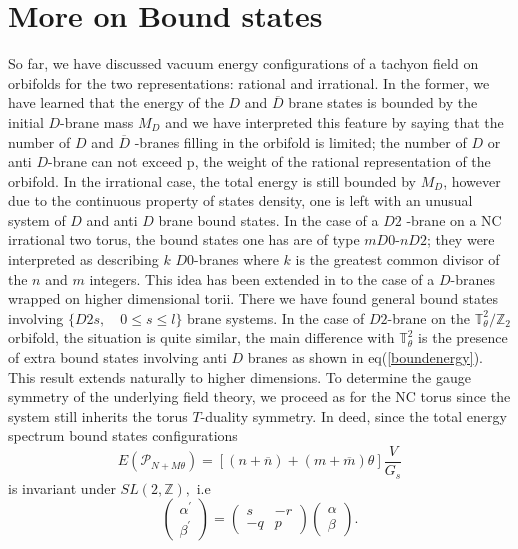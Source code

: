 \documentclass[a4paper,12pt]{article}
\begin{document}
\section{More on Bound states}

So far, we have discussed vacuum energy configurations of a
tachyon field on orbifolds for the two representations: rational
and irrational. In the former, we have learned that the energy of
the $D$ and $\overline{D}$ brane states is bounded by the initial
$D$-brane mass $M_{D}$ and we have
interpreted this feature by saying that the number of $D$ and $\overline{D}$%
-branes filling in the orbifold is limited; the number of $D$ or
anti $D$-brane can not exceed p, the weight of the rational
representation of the orbifold. In the irrational case, the total
energy is still bounded by $M_{D}$, however due to the continuous
property of states density, one is left with an
unusual system of $D$ and anti $D$ brane bound states. In the case of a $D2$%
-brane on a NC irrational two torus, the bound states one has are
of type $mD0$-$nD2$; they were interpreted as describing $k$
$D0$-branes where $k$ is the greatest common divisor of the $n$
and $m$ integers. This idea has been extended in \cite{j} to the
case of a $D$-branes wrapped on higher dimensional torii. There we
have found general bound states involving $\{D2s,\quad 0\le s\le
l\}$
 brane systems.
 In the case of $D2$-brane on the $\mathbb{T}_{\theta }^{2}/\mathbb{Z}_{2}$
orbifold, the situation is quite similar, the main difference with $\mathbb{T%
}_{\theta }^{2}$ is the presence of extra bound states involving
anti $D$ branes as shown in eq(\ref{boundenergy}). This result
extends naturally to higher dimensions. To determine the gauge
symmetry of the underlying field
theory, we proceed as for the NC torus since the system still inherits the torus $%
T $-duality symmetry. In deed, since the total energy spectrum bound states
configurations
\begin{equation}
E\left( \mathcal{P}_{N+M\theta }\right) =\left[ (n+\overline{n})+(m+%
\overline{m})\theta \right] \frac{V}{G_{s}}
\end{equation}
is invariant under $SL(2,\mathbb{Z}),$ i.e
\begin{equation*}
\left(
\begin{array}{c}
\alpha ^{\prime } \\
\beta ^{\prime }
\end{array}
\right) =\left(
\begin{array}{cc}
s & -r \\
-q & p
\end{array}
\right) \left(
\begin{array}{c}
\alpha \\
\beta
\end{array}
\right) .
\end{equation*}
\end{document}

